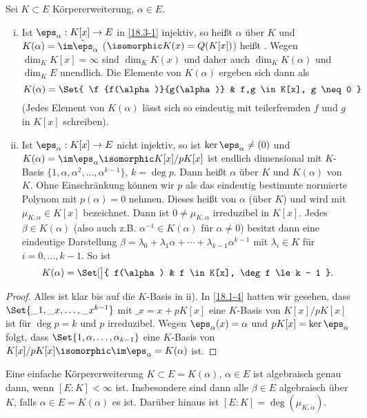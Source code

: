 \begin{df} \label{18.3-2}
	Sei $K \subset E$ Körpererweiterung, $\alpha \in E$.
	\begin{enumerate}[i)]
		\item
			Ist $\eps_\alpha : K[x] \to E$ in \ref{18.3-1} injektiv, so heißt $\alpha$  über $K$ und $K(\alpha) = \im \hat \eps_\alpha$ ($\isomorphic K(x) = Q(K[x])$) heißt .
			Wegen $\dim_K K[x] = \infty$ sind $\dim_K K(x)$ und daher auch $\dim_K K(\alpha)$ und $\dim_K E$ unendlich.
			Die Elemente von $K(\alpha)$ ergeben sich dann als
			\[
				K(\alpha) = \Set{ \f{f(\alpha)}{g(\alpha)} & f,g \in K[x], g \neq 0 }
			\]
			(Jedes Element von $K(\alpha)$ lässt sich so eindeutig mit teilerfremden $f$ und $g$ in $K[x]$ schreiben).
		\item
			Ist $\eps_\alpha: K[x] \to E$ nicht injektiv, so ist $\ker \eps_\alpha \neq (0)$ und $K(\alpha) = \im \eps_\alpha \isomorphic K[x] / pK[x]$ ist endlich dimensional mit $K$-Basis $\{1, \alpha, \alpha^2, \dotsc, \alpha^{k-1}\}$, $k = \deg p$.
			Dann heißt $\alpha$  über $K$ und $K(\alpha)$  von $K$.
			Ohne Einschränkung können wir $p$ als das eindeutig bestimmte normierte Polynom mit $p(\alpha) = 0$ nehmen.
			Dieses heißt  von $\alpha$ (über $K$) und wird mit $\mu_{K,\alpha} \in K[x]$ bezeichnet.
			Dann ist $0 \neq \mu_{K, \alpha}$ irreduzibel in $K[x]$.
			Jedes $\beta \in K(\alpha)$ (also auch z.B. $\alpha^{-1} \in K(\alpha)$ für $\alpha \neq 0$) besitzt dann eine eindeutige Darstellung $\beta = \lambda_0 + \lambda_1 \alpha + \dotsb + \lambda_{k-1} \alpha^{k-1}$ mit $\lambda_i \in K$ für $i = 0, \dotsc, k-1$.
			So ist
			\[
				K(\alpha) = \Set[\big]{ f(\alpha) & f \in K[x], \deg f \le k - 1 }.
			\]
	\end{enumerate}
	\begin{proof}
		Alles ist klar bis auf die $K$-Basis in ii).
		In \ref{18.1-4} hatten wir gesehen, dass $\Set{ \_1, \_x, \dotsc, \_x^{k-1} }$ mit $\_x = x + p K[x]$ eine $K$-Basis von $K[x] / p K[x]$ ist für $\deg p = k$ und $p$ irreduzibel.
		Wegen $\eps_\alpha(x) = \alpha$ und $p K[x] = \ker \eps_\alpha$ folgt, dass $\Set{ 1, \alpha, \dotsc, \alpha_{k-1} }$ eine $K$-Basis von $K[x] / pK[x] \isomorphic \im \eps_\alpha = K(\alpha)$ ist.
	\end{proof}
\end{df}

\begin{kor} \label{18.3-3}
	Eine einfache Körpererweiterung $K \subset E = K(\alpha)$, $\alpha \in E$ ist algebraisch genau dann, wenn $[E : K] < \infty$ ist.
	Insbesondere sind dann alle $\beta \in E$ algebraisch über $K$, falls $\alpha \in E = K(\alpha)$ es ist.
	Darüber hinaus ist $[E : K] = \deg(\mu_{K, \alpha})$.
\end{kor}

